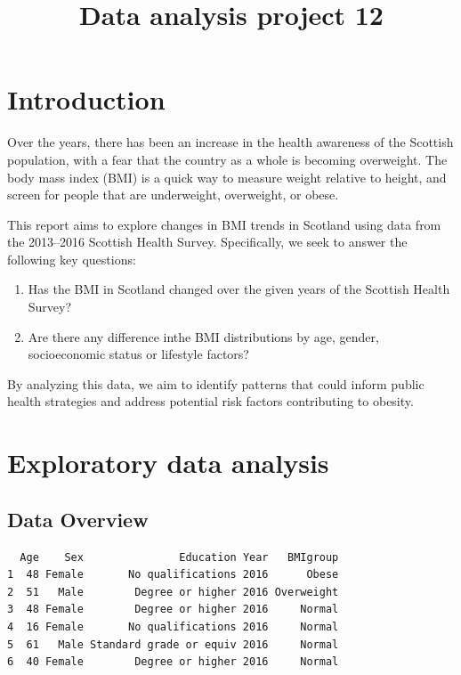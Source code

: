 \documentclass[
  letterpaper,
  DIV=11,
  numbers=noendperiod]{scrartcl}
\title{Data analysis project 12}
\author{}
\date{}
\providecommand{\tightlist}{%
  \setlength{\itemsep}{0pt}\setlength{\parskip}{0pt}}\usepackage{longtable,booktabs,array}
\begin{document}
\maketitle


\section{Introduction}\label{sec-intro}

Over the years, there has been an increase in the health awareness of
the Scottish population, with a fear that the country as a whole is
becoming overweight. The body mass index (BMI) is a quick way to measure
weight relative to height, and screen for people that are underweight,
overweight, or obese.

This report aims to explore changes in BMI trends in Scotland using data
from the 2013--2016 Scottish Health Survey. Specifically, we seek to
answer the following key questions:

\begin{enumerate}
\def\labelenumi{\arabic{enumi}.}
\tightlist
\item
  Has the BMI in Scotland changed over the given years of the Scottish
  Health Survey?
\item
  Are there any difference inthe BMI distributions by age, gender,
  socioeconomic status or lifestyle factors?
\end{enumerate}

By analyzing this data, we aim to identify patterns that could inform
public health strategies and address potential risk factors contributing
to obesity.

\section{Exploratory data analysis}\label{sec-expdata}

\subsection{Data Overview}\label{data-overview}

\begin{verbatim}
  Age    Sex               Education Year   BMIgroup
1  48 Female       No qualifications 2016      Obese
2  51   Male        Degree or higher 2016 Overweight
3  48 Female        Degree or higher 2016     Normal
4  16 Female       No qualifications 2016     Normal
5  61   Male Standard grade or equiv 2016     Normal
6  40 Female        Degree or higher 2016     Normal
\end{verbatim}
\end{document}
